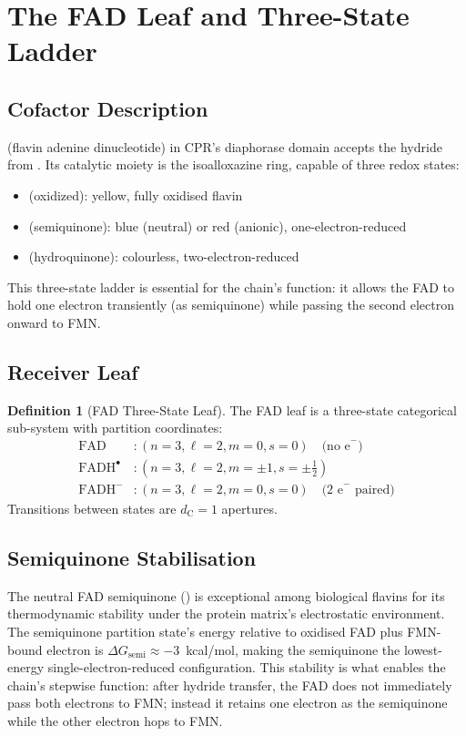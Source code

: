\documentclass[11pt,twocolumn,a4paper]{article}
\theoremstyle{definition}
\newtheorem{definition}[theorem]{Definition}
\theoremstyle{remark}
\newcommand{\dC}{d_{\mathrm{C}}}
\begin{document}
\section{The FAD Leaf and Three-State Ladder}
\label{sec:fad_leaf}

\subsection{Cofactor Description}

 (flavin adenine dinucleotide) in CPR's diaphorase domain accepts
the hydride from . Its catalytic moiety is the isoalloxazine
ring, capable of three redox states:
\begin{itemize}[nosep]
\item {} (oxidized): yellow, fully oxidised flavin
\item {} (semiquinone): blue (neutral) or red (anionic), one-electron-reduced
\item {} (hydroquinone): colourless, two-electron-reduced
\end{itemize}
This three-state ladder is essential for the chain's function: it allows
the FAD to hold one electron transiently (as semiquinone) while passing
the second electron onward to FMN.

\subsection{Receiver Leaf}

\begin{definition}[FAD Three-State Leaf]
\label{def:fad_leaf}
The FAD leaf is a three-state categorical sub-system with partition
coordinates:
\begin{align*}
\mathrm{FAD} &: (n=3, \ell=2, m=0, s=0) \quad \text{(no e}^-\text{)} \\
\mathrm{FADH}^\bullet &: (n=3, \ell=2, m=\pm 1, s=\pm\tfrac{1}{2}) \\
\mathrm{FADH}^- &: (n=3, \ell=2, m=0, s=0) \quad \text{(2 e}^-\text{ paired)}
\end{align*}
Transitions between states are $\dC = 1$ apertures.
\end{definition}

\subsection{Semiquinone Stabilisation}

The neutral FAD semiquinone () is exceptional among biological
flavins for its thermodynamic stability under the protein matrix's
electrostatic environment. The semiquinone partition state's energy
relative to oxidised FAD plus FMN-bound electron is
$\Delta G_{\mathrm{semi}} \approx -3$~kcal/mol, making the semiquinone
the lowest-energy single-electron-reduced configuration. This stability
is what enables the chain's stepwise function: after hydride transfer,
the FAD does not immediately pass both electrons to FMN; instead it
retains one electron as the semiquinone while the other electron hops
to FMN.
\end{document}
